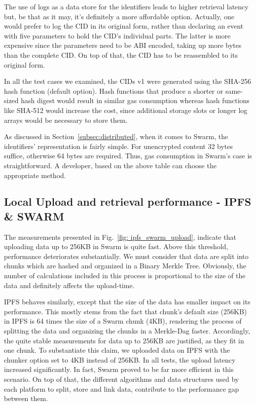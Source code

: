 The use of logs as a data store for the identifiers leads to higher retrieval latency but, be that as it may, it’s definitely a more affordable option. Actually, one would prefer to log the CID in its original form, rather than declaring an event with five parameters to hold the CID’s individual parts. The latter is more expensive since the parameters need to be ABI encoded, taking up more bytes than the complete CID. On top of that, the CID has to be reassembled to its original form.

In all the test cases we examined, the CIDs v1 were generated using the SHA-256 hash function (default option). Hash functions that produce a shorter or same-sized hash digest would result in similar gas consumption whereas hash functions like SHA-512 would increase the cost, since additional storage slots or longer log arrays would be necessary to store them.

As discussed in Section~\ref{subsec:distributed}, when it comes to Swarm, the identifiers’ representation is fairly simple. For unencrypted content 32 bytes suffice, otherwise 64 bytes are required. Thus, gas consumption in Swarm’s case is straightforward. A developer, based on the above table can choose the appropriate method.
\subsection{Local Upload and retrieval performance - IPFS \& SWARM}\label{subsection:}
The measurements presented in Fig.~\ref{fig: ipfs_swarm_upload}, indicate that uploading data up to 256KB in Swarm is quite fast. Above this threshold, performance deteriorates substantially. We must consider that data are split into chunks which are hashed and organized in a Binary Merkle Tree. Obviously, the number of calculations included in this process is proportional to the size of the data and definitely affects the upload-time.

IPFS behaves similarly, except that the size of the data has smaller impact on its performance. This mostly stems from the fact that chunk’s default size (256KB) in IPFS is 64 times the size of a Swarm chunk (4KB), rendering the process of splitting the data and organizing the chunks in a Merkle-Dag faster. Accordingly, the quite stable measurements for data up to 256KB are justified, as they fit in one chunk. To substantiate this claim, we uploaded data on IPFS with the chunker option set to 4KB instead of 256KB. In all tests, the upload latency increased significantly. In fact, Swarm proved to be far more efficient in this scenario. On top of that, the different algorithms and data structures used by each platform to split, store and link data, contribute to the performance gap between them.

